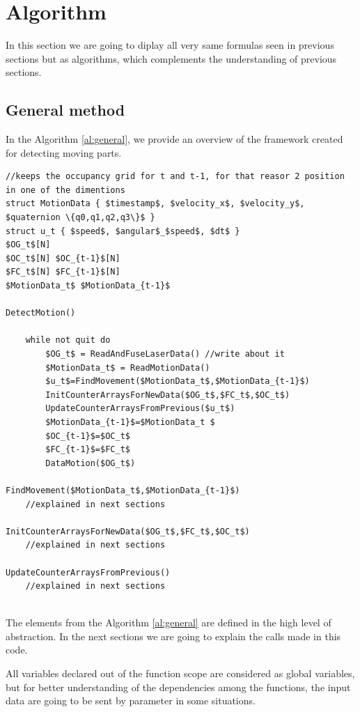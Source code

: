 \section{Algorithm}

In this section we are going to diplay all very same formulas seen in previous sections but as algorithms, which complements the understanding of previous sections.

\subsection{General method}

In the Algorithm \ref{al:general}, we provide an overview of the framework created for detecting moving parts.

\begin{lstlisting}[title={Algorithm},mathescape=true,label=al:general,caption={General framework algorithm for motion detection}]
//keeps the occupancy grid for t and t-1, for that reasor 2 position in one of the dimentions
struct MotionData { $timestamp$, $velocity_x$, $velocity_y$, $quaternion \{q0,q1,q2,q3\}$ }
struct u_t { $speed$, $angular$_$speed$, $dt$ }
$OG_t$[N]
$OC_t$[N] $OC_{t-1}$[N]
$FC_t$[N] $FC_{t-1}$[N]
$MotionData_t$ $MotionData_{t-1}$

DetectMotion() 

	while not quit do 
		$OG_t$ = ReadAndFuseLaserData() //write about it
		$MotionData_t$ = ReadMotionData()
		$u_t$=FindMovement($MotionData_t$,$MotionData_{t-1}$)
		InitCounterArraysForNewData($OG_t$,$FC_t$,$OC_t$)
		UpdateCounterArraysFromPrevious($u_t$)
		$MotionData_{t-1}$=$MotionData_t $
		$OC_{t-1}$=$OC_t$
		$FC_{t-1}$=$FC_t$
		DataMotion($OG_t$)

FindMovement($MotionData_t$,$MotionData_{t-1}$)
	//explained in next sections

InitCounterArraysForNewData($OG_t$,$FC_t$,$OC_t$)
	//explained in next sections

UpdateCounterArraysFromPrevious()
	//explained in next sections
	
\end{lstlisting}

The elements from the Algorithm \ref{al:general} are defined in the high level of abstraction. In the next sections we are going to explain the calls made in this code.

All variables declared out of the function scope are considered as global variables, but for better understanding of the dependencies among the functions, the input data are going to be sent by parameter in some situations.

